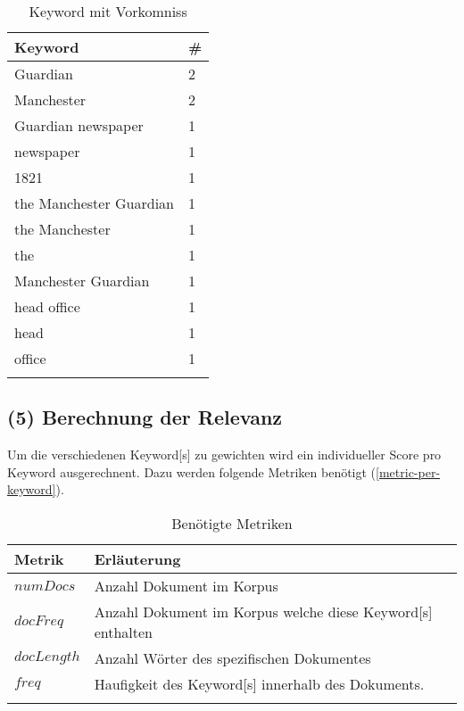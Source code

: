 \begin{longtable}{|p{4cm}| p{1cm}|}
  \hline
    \gls{Keyword} & \#\\\hline
    Guardian & 2  \\\hline
    Manchester & 2  \\\hline
    Guardian newspaper & 1  \\\hline
    newspaper & 1  \\\hline
    1821 & 1  \\\hline
    the Manchester Guardian & 1  \\\hline
    the Manchester & 1  \\\hline
    the & 1  \\\hline
    Manchester Guardian & 1  \\\hline
    head office & 1  \\\hline
    head & 1  \\\hline
    office & 1  \\\hline
        \caption{Keyword mit Vorkomniss}
    \label{keyword-with-count}
\end{longtable}



\subsection{(5) Berechnung der Relevanz}\label{calcrelevance}


Um die verschiedenen \gls{Keyword}[s] zu gewichten wird ein individueller Score pro \gls{Keyword} ausgerechnent. Dazu werden folgende Metriken benötigt (\autoref{metric-per-keyword}).

\begin{longtable}{|p{2cm}| p{8cm}|}
  \hline
    Metrik & Erläuterung\\\hline
    $numDocs$ & Anzahl Dokument im Korpus \\\hline
    $docFreq$ & Anzahl Dokument im Korpus welche diese \gls{Keyword}[s] enthalten \\\hline
    $docLength$ & Anzahl Wörter des spezifischen Dokumentes \\\hline
    $freq$ & Haufigkeit des \gls{Keyword}[s] innerhalb des Dokuments. \\\hline
    \caption{Benötigte Metriken}
    \label{metric-per-keyword}
\end{longtable}


